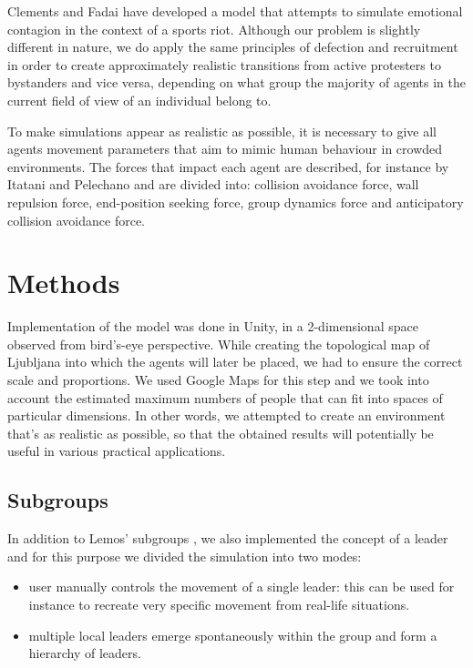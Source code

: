 \documentclass[9pt]{pnas-new}
\begin{document}
\bigskip
Clements and Fadai \cite{sportsriots} have developed a model that attempts to simulate emotional contagion in the context of a sports riot. Although our problem is slightly different in nature, we do apply the same principles of defection and recruitment in order to create approximately realistic transitions from active protesters to bystanders and vice versa, depending on what group the majority of agents in the current field of view of an individual belong to. 

\bigskip
To make simulations appear as realistic as possible, it is necessary to give all agents movement parameters that aim to mimic human behaviour in crowded environments. The forces that impact each agent are described, for instance by Itatani and Pelechano \cite{socialcrowdsimulation} and are divided into: collision avoidance force, wall repulsion force, end-position seeking force, group dynamics force and anticipatory collision avoidance force. 

\section*{Methods}

Implementation of the model was done in Unity, in a 2-dimensional space observed from bird's-eye perspective. While creating the topological map of Ljubljana into which the agents will later be placed, we had to ensure the correct scale and proportions. We used Google Maps for this step and we took into account the estimated maximum numbers of people that can fit into spaces of particular dimensions. In other words, we attempted to create an environment that's as realistic as possible, so that the obtained results will potentially be useful in various practical applications. 

\subsection*{Subgroups}
In addition to Lemos' subgroups \cite{protests}, we also implemented the concept of a leader and for this purpose we divided the simulation into two modes:
\begin{itemize}
    \item user manually controls the movement of a single leader: this can be used for instance to recreate very specific movement from real-life situations.
    \item multiple local leaders emerge spontaneously within the group and form a hierarchy of leaders.
\end{itemize}
\end{document}
